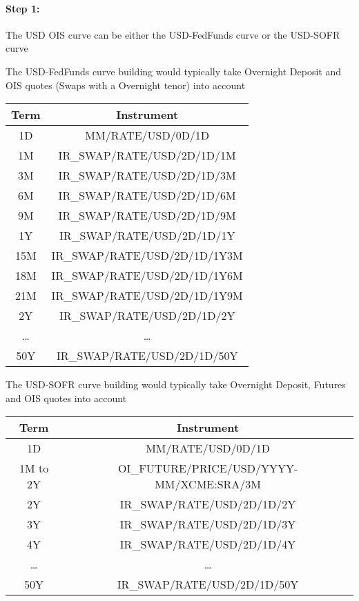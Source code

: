 \medskip
\paragraph*{Step 1:} The USD OIS curve can be either the USD-FedFunds curve or the USD-SOFR curve

The USD-FedFunds curve building would
typically take  Overnight Deposit and OIS quotes (Swaps with a Overnight tenor) into account 

{\small
\begin{center}
\begin{tabular}{|c|c|}
\hline
Term & Instrument \\
\hline
\hline
1D & MM/RATE/USD/0D/1D \\
\hline
1M & IR\_SWAP/RATE/USD/2D/1D/1M \\
3M & IR\_SWAP/RATE/USD/2D/1D/3M \\
6M & IR\_SWAP/RATE/USD/2D/1D/6M \\
9M & IR\_SWAP/RATE/USD/2D/1D/9M \\
1Y & IR\_SWAP/RATE/USD/2D/1D/1Y \\
15M & IR\_SWAP/RATE/USD/2D/1D/1Y3M \\
18M & IR\_SWAP/RATE/USD/2D/1D/1Y6M \\
21M & IR\_SWAP/RATE/USD/2D/1D/1Y9M \\
2Y & IR\_SWAP/RATE/USD/2D/1D/2Y \\
\dots& \dots \\
50Y & IR\_SWAP/RATE/USD/2D/1D/50Y \\ 
\hline
\end{tabular}
\end{center}
}


The USD-SOFR curve building would
typically take Overnight Deposit, Futures and OIS quotes into account 

{\small
\begin{center}
\begin{tabular}{|c|c|}
\hline
Term & Instrument \\
\hline
\hline
1D & MM/RATE/USD/0D/1D \\
\hline
1M to 2Y & OI\_FUTURE/PRICE/USD/YYYY-MM/XCME:SRA/3M \\
\hline
2Y & IR\_SWAP/RATE/USD/2D/1D/2Y \\
3Y & IR\_SWAP/RATE/USD/2D/1D/3Y \\
4Y & IR\_SWAP/RATE/USD/2D/1D/4Y \\
\dots& \dots \\
50Y & IR\_SWAP/RATE/USD/2D/1D/50Y \\ 
\hline
\end{tabular}
\end{center}
}

